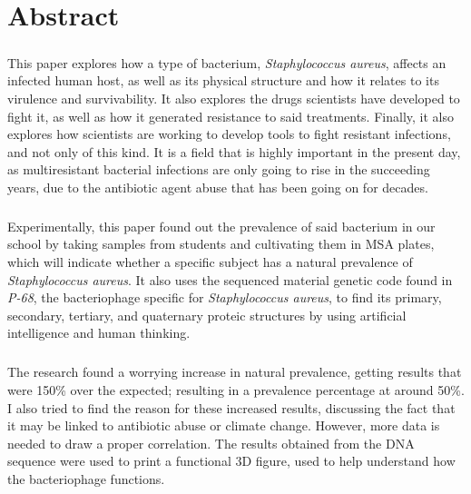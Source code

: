 \documentclass[fontsize=12pt,twoside=semi,openright,numbers=noenddot,parskip=half]{scrbook}
\begin{document}
\chapter*{Abstract}
\paragraph{}This paper explores how a type of bacterium, \emph{Staphylococcus aureus}, affects an infected human host, as well as its physical structure and how it relates to its virulence and survivability. It also explores the drugs scientists have developed to fight it, as well as how it generated resistance to said treatments. Finally, it also explores how scientists are working to develop tools to fight resistant infections, and not only of this kind. It is a field that is highly important in the present day, as multiresistant bacterial infections are only going to rise in the succeeding years, due to the antibiotic agent abuse that has been going on for decades.
\paragraph{}Experimentally, this paper found out the prevalence of said bacterium in our school by taking samples from students and cultivating them in MSA plates, which will indicate whether a specific subject has a natural prevalence of \emph{Staphylococcus aureus}. It also uses the sequenced material genetic code found in \emph{P-68}, the bacteriophage specific for \emph{Staphylococcus aureus}, to find its primary, secondary, tertiary, and quaternary proteic structures by using artificial intelligence and human thinking.
\paragraph{}The research found a worrying increase in natural prevalence, getting results that were 150\% over the expected; resulting in a prevalence percentage at around 50\%. I also tried to find the reason for these increased results, discussing the fact that it may be linked to antibiotic abuse or climate change. However, more data is needed to draw a proper correlation. The results obtained from the DNA sequence were used to print a functional 3D figure,  used to help understand how the bacteriophage functions.
\end{document}
